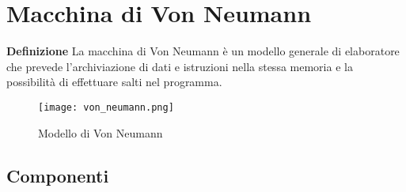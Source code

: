\documentclass{article}
\begin{document}
\newpage

\section{Macchina di Von Neumann}

\textbf{Definizione} La macchina di Von Neumann è un modello generale di elaboratore che prevede l'archiviazione di dati e istruzioni nella stessa memoria e la possibilità di effettuare salti nel programma.
\begin{figure}[ht]
    \centering
    \texttt{[image: von\_neumann.png]}
    \caption{Modello di Von Neumann}
    \label{fig:von_neumann}
\end{figure}

\newpage

\subsection{Componenti}
\end{document}
